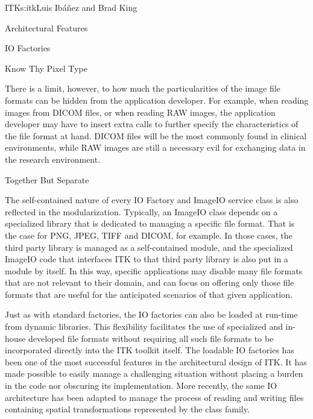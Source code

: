 \begin{aosachapter}{ITK}{s:itk}{Luis Ib\'{a}\~{n}ez and Brad King}
\begin{aosasect1}{Architectural Features}
\begin{aosasect2}{IO Factories}
\begin{aosasect3}{Know Thy Pixel Type}
\begin{aosaitemize}
\item {}
\item {}
\item {}
\item {}
\end{aosaitemize}

There is a limit, however, to how much the particularities of the image file
formats can be hidden from the application developer.  For example, when
reading images from DICOM files, or when reading RAW images, the application
developer may have to insert extra calls to further specify the characteristics
of the file format at hand. DICOM files will be the most commonly found in
clinical environments, while RAW images are still a necessary evil for
exchanging data in the research environment.

\end{aosasect3}

\begin{aosasect3}{Together But Separate}

The self-contained nature of every IO Factory and ImageIO service class is
also reflected in the modularization. Typically, an ImageIO class depends on a
specialized library that is dedicated to managing a specific file format. That
is the case for PNG, JPEG, TIFF and DICOM, for example. In those cases, the
third party library is managed as a self-contained module, and the specialized
ImageIO code that interfaces ITK to that third party library is also put in a
module by itself. In this way, specific applications may disable many
file formats that are not relevant to their domain, and can focus on offering
only those file formats that are useful for the anticipated scenarios of that
given application.

Just as with standard factories, the IO factories can also be loaded at
run-time from dynamic libraries. This flexibility facilitates the use of
specialized and in-house developed file formats without requiring all such file
formats to be incorporated directly into the ITK toolkit itself. The loadable
IO factories has been one of the most successful features in the architectural
design of ITK. It has made possible to easily manage a challenging situation
without placing a burden in the code nor obscuring its implementation. More
recently, the same IO architecture has been adapted to manage the process of
reading and writing files containing spatial transformations represented by the
 class family.


\end{aosasect3}
\end{aosasect2}
\end{aosasect1}
\end{aosachapter}

